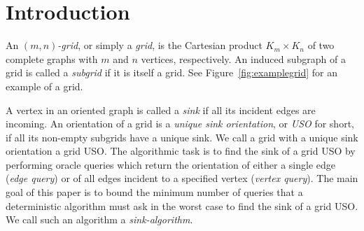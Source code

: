 \documentclass[runningheads,a4paper]{llncs}
\newcommand{\sinkalg}{sink-algorithm\xspace}
\begin{document}
\section{Introduction}
An \emph{$(m,n)$-grid}, or simply a \emph{grid}, is the Cartesian product $K_m \times K_n$ of two complete graphs with $m$ and $n$ vertices, respectively. 
An induced subgraph of a grid is called a \emph{subgrid} if it is itself a grid.
See Figure~\ref{fig:examplegrid} for an example of a grid.

A vertex in an oriented graph is called a \emph{sink} if all its incident edges are incoming.
An orientation of a grid is a \emph{unique sink orientation}, or \emph{USO}
for short, if all its non-empty subgrids have a unique sink. We call a grid with a unique sink orientation a grid USO.
The algorithmic task is to find the sink of a grid USO by performing oracle queries which return the orientation of either a single edge (\emph{edge query}) or of all edges incident to a specified vertex (\emph{vertex query}). 
The main goal of this paper is to bound the minimum number of queries that a deterministic algorithm must ask in the worst case to find the sink of a grid USO. We call such an algorithm a \emph{\sinkalg}.
\end{document}
